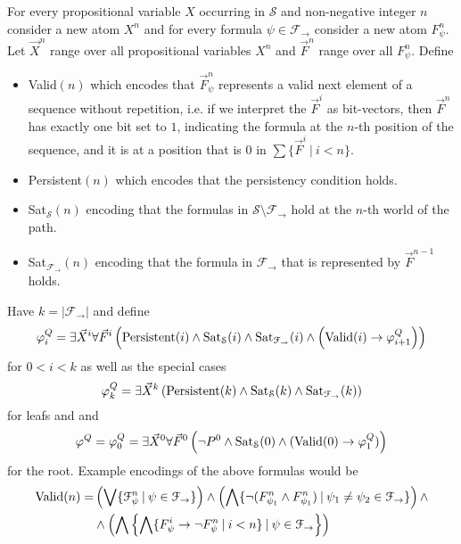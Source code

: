 \documentclass[a4paper,UKenglish,cleveref, autoref, thm-restate]{lipics-v2021}
\begin{document}
\begin{definition}
	For every propositional variable $X$ occurring in $\mathcal S$ and non-negative integer $n$ consider a new atom $X^n$ and for every formula $\psi\in\mathcal F_\to$ consider a new atom $F_\psi^n$. Let $\vec X^n$ range over all propositional variables $X^n$ and $\vec F^n$ range over all $F_\psi^n$. Define
	\begin{itemize}
		\item {\normalfont Valid}$(n)$ which encodes that $\vec F^n_\psi$ represents a valid next element of a sequence without repetition, i.e. if we interpret the $\vec F^i$ as bit-vectors, then $\vec F^n$ has exactly one bit set to $1$, indicating the formula at the $n$-th position of the sequence, and it is at a position that is $0$ in $\sum\{\vec F^i\:|\:i < n\}$.
		\item {\normalfont Persistent}$(n)$ which encodes that the persistency condition holds.
		\item {\normalfont Sat}$_{\mathcal S}(n)$ encoding that the formulas in $\mathcal S\setminus\mathcal F_\to$ hold at the $n$-th world of the path.
		\item {\normalfont Sat}$_{\mathcal F_\to}(n)$ encoding that the formula in $\mathcal F_\to$ that is represented by $\vec F^{n-1}$ holds.
	\end{itemize}
	Have $k = |\mathcal F_\to|$ and define$$\varphi^Q_{i} = \exists \vec X^i\forall \vec F^i\left(\text{\normalfont Persistent}(i)\wedge \text{\normalfont Sat}_{\mathcal S}(i)\wedge \text{\normalfont Sat}_{\mathcal F_\to}(i)\wedge\left(\text{\normalfont Valid}(i)\to \varphi^Q_{i+1}\right)\right)$$
	for $0 < i < k$ as well as the special cases
	$$\varphi^Q_{k} = \exists \vec X^k\left(\text{\normalfont Persistent}(k)\wedge \text{\normalfont Sat}_{\mathcal S}(k)\wedge \text{\normalfont Sat}_{\mathcal F_\to}(k)\right)$$
	for leafs and
	and $$\varphi^Q = \varphi_0^Q = \exists \vec X^0\forall \vec F^0\left(\neg P^0\wedge \text{\normalfont Sat}_{\mathcal S}(0)\wedge(\text{\normalfont Valid}(0)\to \varphi_1^Q)\right)$$for the root.
	Example encodings of the above formulas would be
	\begin{align*}
		\text{\normalfont Valid}(n) = &\left(\bigvee \{\mathcal F^n_\psi\:|\:\psi\in\mathcal F_\to\}\right)\wedge\left(\bigwedge \{\neg(F^n_{\psi_1}\wedge F^n_{\psi_1})\:|\:\psi_1\neq\psi_2\in\mathcal F_\to\}\right)\wedge\\&\wedge\left(\bigwedge\left\{\bigwedge\{F^i_\psi\to\neg F^n_\psi\:|\:i < n\}\:|\:\psi\in\mathcal F_\to\right\}\right)\\

\end{align*}
\end{definition}
\end{document}
